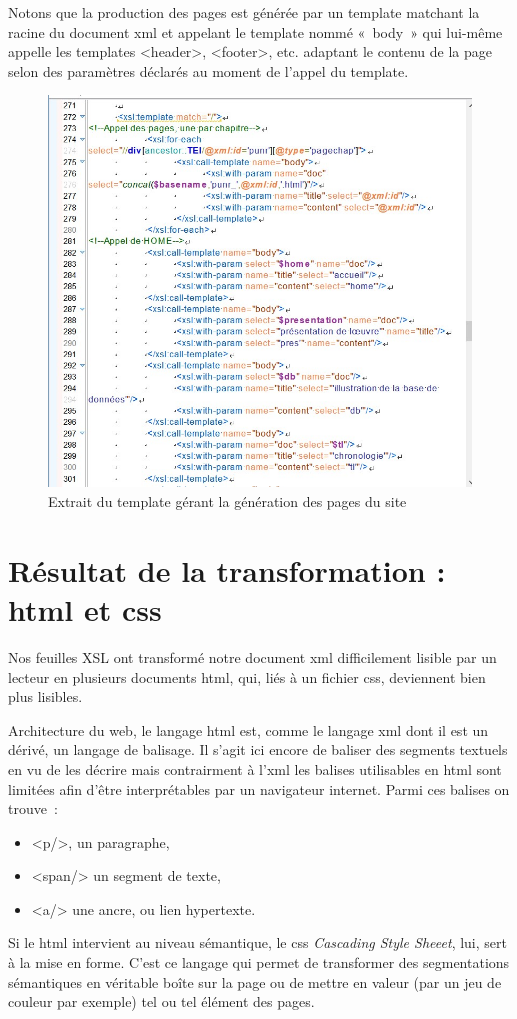 \documentclass[12pt, a4paper]{article}
\begin{document}
Notons que la production des pages est générée par un template matchant la racine du document xml et appelant le template nommé «~body~» qui lui-même appelle les templates \go<header>\gf, \go<footer>\gf, etc. adaptant le contenu de la page selon des paramètres déclarés au moment de l'appel du template.
\begin{figure}[H]
    \centering
    \includegraphics[scale=0.5]{img/screen_body.jpg}
    \caption{Extrait du template gérant la génération des pages du site}
    \label{fig:enter-label}
\end{figure}

\section{Résultat de la transformation : html et css}

\label{htmlCss}

Nos feuilles XSL ont transformé notre document xml difficilement lisible par un lecteur en plusieurs documents html, qui, liés à un fichier css, deviennent bien plus lisibles.

Architecture du web, le langage html est, comme le langage xml dont il est un dérivé, un langage de balisage. Il s'agit ici encore de baliser des segments textuels en vu de les décrire mais contrairment à l'xml les balises utilisables en html sont limitées afin d'être interprétables par un navigateur internet. Parmi ces balises on trouve~:
\begin{itemize}
    \item <p/>, un paragraphe,
    \item <span/> un segment de texte,
    \item <a/> une ancre, ou lien hypertexte.
\end{itemize}
Si le html intervient au niveau sémantique, le css \textit{Cascading Style Sheeet}, lui, sert à la mise en forme. C'est ce langage qui permet de transformer des segmentations sémantiques en véritable boîte sur la page ou de mettre en valeur (par un jeu de couleur par exemple) tel ou tel élément des pages.
\end{document}
